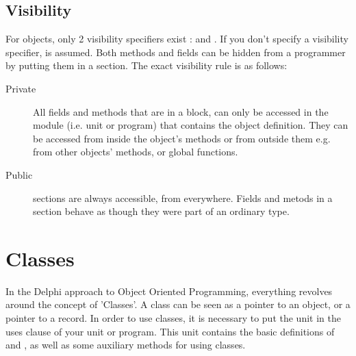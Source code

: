 \documentclass{report}
\begin{document}
\section{Visibility}
For objects, only 2 visibility specifiers exist :  and 
. If you don't specify a visibility specifier,  
is assumed.
Both methods and fields can be hidden from a programmer by putting them
in a  section. The exact visibility rule is as follows:
\begin{description}
\item [Private\ ] All fields and methods that are in a  block, 
can  only be accessed in the module (i.e. unit or program) that contains 
the object definition.
They can be accessed from inside the object's methods or from outside them
e.g. from other objects' methods, or global functions.
\item [Public\ ] sections are always accessible, from everywhere.
Fields and metods in a  section behave as though they were part
of an ordinary  type.
\end{description}
\chapter{Classes}
In the Delphi approach to Object Oriented Programming, everything revolves
around  the concept of 'Classes'.  A class can be seen as a pointer to an 
object, or a pointer to a record. 
In order to use classes, it is necessary to put the  unit in the
uses clause of your unit or program. This unit contains the basic
definitions of  and , as well as some auxiliary
methods for using classes.
\end{document}
